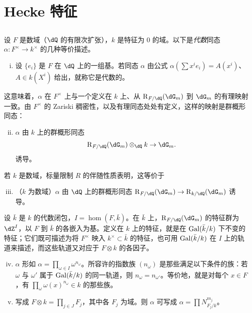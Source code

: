 \section{Hecke 特征}\label{VI:5}

\subsection{}\label{VI:5-1}

设 $F$ 是数域（$\dQ$ 的有限次扩张），$k$ 是特征为 $0$ 的域。以下是\emph{代数}同态 $\alpha:F^\times \to k^\times$ 的几种等价描述。
\begin{enumerate}[(i)]
  \item 设 $\{e_i\}$ 是 $F$ 在 $\dQ$ 上的一组基。若同态 $\alpha$ 由公式 $\alpha(\sum x^i e_i) = A(x^i)$、$A\in k(X^i)$ 给出，就称它是代数的。
\end{enumerate}

这意味着，$\alpha$ 在 $F^\times$ 上与一个定义在 $k$ 上、从 $\res_{F/\dQ}(\dG_m)$ 到 $\dG_m$ 的有理映射一致。由 $F^\times$ 的 Zariski 稠密性，以及有理同态处处有定义，这样的映射是群概形同态：
\begin{enumerate}[(i)]
\setcounter{enumi}{1}
  \item $\alpha$ 由 $k$ 上的群概形同态
    \[
      \res_{F/\dQ}(\dG_m)\otimes_\dQ k \to \dG_m \text{.}
    \]
    诱导。
\end{enumerate}

若 $k$ 是数域，标量限制 $R$ 的伴随性质表明，这等价于
\begin{enumerate}[(i)]
\setcounter{enumi}{2}
  \item （$k$ 为数域）$\alpha$ 由 $\dQ$ 上的群概形同态 $\res_{F/\dQ}(\dG_m) \to \res_{k/\dQ}(\dG_m)$ 诱导。
\end{enumerate}

设 $\bar k$ 是 $k$ 的代数闭包，$I=\hom(F,\bar k)$。在 $\bar k$ 上，$\res_{F/\dQ}(\dG_m)$ 的特征群为 $\dZ^I$，以 $F$ 到 $\bar k$ 的各嵌入为基。定义在 $k$ 上的特征，就是在 $\operatorname{Gal}(\bar k/k)$ 下不变的特征；它们既可描述为将 $F^\times$ 映入 $k^\times\subset \bar k$ 的特征，也可用 $\operatorname{Gal}(\bar k/k)$ 在 $I$ 上的轨道来描述，而这些轨道又对应于 $F\otimes k$ 的各因子。
\begin{enumerate}[(i)]
\setcounter{enumi}{3}
  \item $\alpha$ 形如 $\alpha=\prod_{\omega\in I} \omega^{n_\omega}$。所容许的指数族 $(n_\omega)$ 是那些满足以下条件的族：若 $\omega$ 与 $\omega'$ 属于 $\operatorname{Gal}(\bar k/k)$ 的同一轨道，则 $n_\omega=n_{\omega'}$。等价地，就是对每个 $x\in F$，有 $\prod_\omega \omega(x)^{n_\omega}\in k$ 的那些族。
  \item 写成 $F\otimes k=\prod_{j\in J} F_j$，其中各 $F_j$ 为域。则 $\alpha$ 可写成 $\alpha=\prod N_{F_j/k}^{m_j}$。
\end{enumerate}


